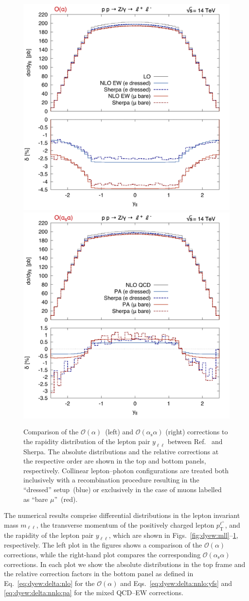 \documentclass[11pt]{cernrep}
\newcommand{\order}{\ensuremath{\mathcal{O}}}
\newcommand{\alphas}{\ensuremath{\alpha_\mathrm{s}}}
\newcommand{\rT}{\ensuremath{\mathrm{T}}} %
\DeclareRobustCommand{\Pl}{{\ensuremath{\ell}}}
\DeclareRobustCommand{\Plp}{{\ensuremath{\ell^+}}}
\begin{document}
\begin{figure}
  \includegraphics[width=.48\linewidth]{images/Z_yll_LO.pdf} \hfill
  \includegraphics[width=.48\linewidth]{images/Z_yll_NLO.pdf}
  \caption{
    Comparison of the $\order(\alpha)$~(left) and $\order(\alphas\alpha)$ 
    (right) corrections to the rapidity distribution of the lepton pair 
    $y_{\Pl\Pl}$ between Ref.~\cite{Dittmaier:2015rxo} and Sherpa. The 
    absolute distributions and the relative corrections at the respective 
    order are shown in the top and bottom panels, respectively. Collinear 
    lepton--photon configurations are treated both inclusively with a 
    recombination procedure resulting in the ``dressed'' setup~(blue) or 
    exclusively in the case of muons labelled as ``bare $\mu$''~(red).
  }
  \label{fig:dyew:yll}
\end{figure}


The numerical results comprise differential distributions in the 
lepton invariant mass $m_{\Pl\Pl}$, the transverse momentum of the 
positively charged lepton $p_\rT^\Plp$, and the rapidity of the 
lepton pair $y_{\Pl\Pl}$, which are shown in 
Figs.~\ref{fig:dyew:mll}--\ref{fig:dyew:yll}, respectively. The left plot 
in the figures shows a comparison of the $\order(\alpha)$ corrections, 
while the right-hand plot compares the corresponding $\order(\alphas\alpha)$ 
corrections. In each plot we show the absolute distributions in 
the top frame and the relative correction factors in the bottom 
panel as defined in Eq.~\eqref{eq:dyew:delta:nlo} for the $\order(\alpha)$ 
and Eqs.~\eqref{eq:dyew:delta:nnlo:yfs} and \eqref{eq:dyew:delta:nnlo:pa} 
for the mixed QCD--EW corrections.
\end{document}
